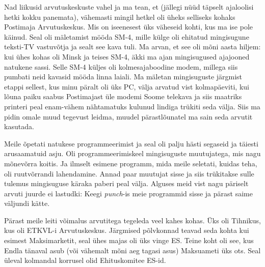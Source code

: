 Nad liikusid arvutuskeskuste vahel ja ma tean, et (jällegi nüüd täpselt 
ajaloolisi hetki kokku panemata), vähemasti mingil hetkel oli üheks selliseks 
kohaks Postimaja Arvutuskeskus. Mis on 
iseenesest üks väheseid kohti, kus ma ise pole käinud. Seal oli mäletamist 
mööda SM-4, mille külge oli ehitatud mingisugune teksti-TV 
vastuvõtja  
ja sealt see kava tuli. Ma arvan, et see oli mõni aasta hiljem: kui 
ühes kohas oli Minsk ja teises SM-4, äkki ma ajan mingisugused ajajooned 
natukene sassi. Selle SM-4  küljes oli kolmesajaboodine modem, millega siis 
pumbati neid kavasid mööda linna laiali. Ma mäletan mingisuguste järgmist 
etappi sellest, kus  minu päralt oli üks PC, välja arvatud vist kolmapäeviti, 
kui lõuna paiku saabus Postimajast üle modemi Soome telekava ja siis maatriks 
printeri peal enam-vähem nähtamatuks kulunud lindiga trükiti seda välja. Siis 
ma pidin omale  muud tegevust leidma, muudel pärastlõunatel ma sain seda 
arvutit kasutada.


Meile õpetati natukese programmeerimist ja seal oli palju hästi segaseid ja 
täiesti arusaamatuid asju. Oli programmeerimiskeel mingisuguste  muutujatega, 
mis nagu mõnevõrra koitis. Ja  ilmselt esimene programm, mida meile seletati, 
kuidas teha, oli ruutvõrrandi lahendamine. Annad paar muutujat sisse ja siis 
trükitakse sulle tulemus mingisuguse käraka  paberi peal välja. Alguses meid 
vist nagu päriselt arvuti juurde ei lastudki: Keegi  \emph{punch}-is meie 
programmid sisse ja pärast saime väljundi kätte. 

Pärast meile leiti võimalus arvutitega tegeleda veel kahes kohas. Üks oli 
Tihnikus, kus oli ETKVL-i Arvutuskeskus. Järgmised 
põlvkonnad teavad seda kohta kui esimest Maksimarketit, seal ühes majas oli üks 
vinge ES. Teine koht oli see, kus Endla tänaval asub (või 
vähemalt mõni aeg tagasi asus) Maksuameti üks ots. Seal  üleval kolmandal 
korrusel olid Ehituskomitee ES-id. 

